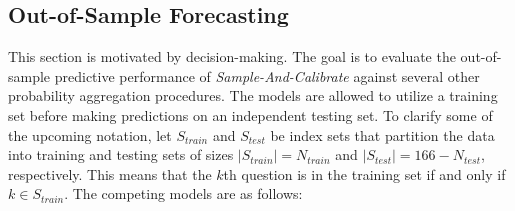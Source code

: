 \documentclass[aoas, preprint]{imsart}
\numberwithin{equation}{section}
\theoremstyle{plain}
\begin{document}
\subsection{Out-of-Sample Forecasting}
\label{forecasting}
This section is motivated by decision-making. 
The goal is to evaluate the out-of-sample predictive performance of \textit{Sample-And-Calibrate} against several other probability aggregation procedures. The models are allowed to utilize a training set before making predictions on an independent testing set. To clarify some of the upcoming notation, let $S_{train}$ and $S_{test}$ be index sets that partition the data into training and testing sets of sizes $|S_{train}| = N_{train}$ and $|S_{test}| = 166 - N_{test}$, respectively. This means that the $k$th question is in the training set if and only if $k \in S_{train}$. The competing models are as follows:
\end{document}
